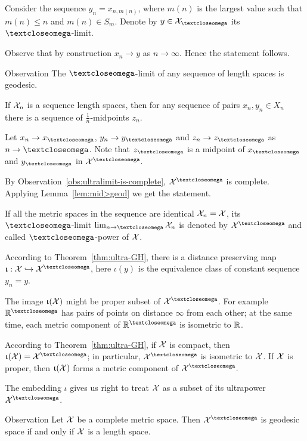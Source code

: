 Consider the sequence $y_n=x_{n,m(n)}$, where $m(n)$ is the largest value such that $m(n)\le n$ and $m(n)\in S_{m}$.
Denote by $y\in \spc{X}_\o$ its $\o$-limit.

Observe that by construction $x_n\to y$ as $n\to \infty$.
Hence the statement follows.
\qeds

\begin{thm}{Observation}\label{obs:ultralimit-is-geodesic}
The $\o$-limit of any sequence of length spaces is geodesic. 
\end{thm}

If $\mathcal{X}_n$ is a sequence length spaces, then for any sequence of pairs $x_n, y_n\in X_n$ there is a sequence of $\tfrac1n$-midpoints $z_n$.

Let $x_n\to x_\o$, $y_n\to y_\o$ and $z_n\to z_\o$ as $n\to \o$.
Note that $z_\o$ is a midpoint of $x_\o$ and $y_\o$ in $\spc{X}^\o$.

By Observation~\ref{obs:ultralimit-is-complete}, $\spc{X}^\o$ is complete.
Applying Lemma~\ref{lem:mid>geod} we get the statement.
\qeds

 If all the metric spaces in the sequence are identical $\mathcal{X}_n=\mathcal{X}$, 
its $\o$-limit 
$\lim_{n\to\o}\spc{X}_n$
is denoted by $\spc{X}^\o$
and called $\o$-power of $\mathcal{X}$.
 
According to Theorem~\ref{thm:ultra-GH},
there is a distance preserving map
$\iota:\spc{X}\hookrightarrow \spc{X}^\o$, here $\iota(y)$ is the equivalence class of constant sequence $y_n=y$. 

The image $\upiota(\mathcal{X})$ might be proper subset of $\spc{X}^\o$.
For example $\RR^\o$ has pairs of points on distance $\infty$ from each other;
at the same time, each metric component of $\RR^\o$ is isometric to $\mathbb{R}$.

According to Theorem~\ref{thm:ultra-GH}, 
if $\mathcal{X}$ is compact, then $\iota(\spc{X})=\spc{X}^\o$;
in particular, $\spc{X}^\o$ is isometric to $\mathcal{X}$.
If $\mathcal{X}$ is proper, then $\upiota(\mathcal{X})$ forms a metric component of $\spc{X}^\o$.

The embedding $\iota$ gives us right to treat $\mathcal{X}$ as a subset of its ultrapower $\spc{X}^\o$. 

\begin{thm}{Observation}\label{obs:ultrapower-is-geodesic}
Let $\mathcal{X}$ be a complete metric space. 
Then $\spc{X}^\o$ is geodesic space if and only if $\mathcal{X}$ is a length space.
\end{thm}

